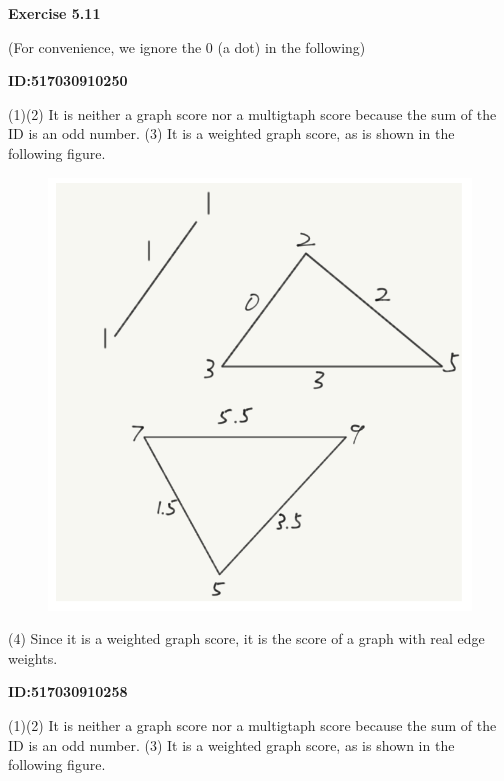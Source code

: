 \documentclass{article} %
\begin{document}
	\textbf{Exercise 5.11}\par
	(For convenience, we ignore the 0 (a dot) in the following)\par
	\textbf{ID:517030910250}\par
	(1)(2) It is neither a graph score nor a multigtaph score because the sum of the ID is an odd number.
	(3) It is a weighted graph score, as is shown in the following figure.
	
	\begin{figure}[H]
		\centering
		\includegraphics[scale=0.6]{10250.png}
		\caption{}
		\label{fig:1}
	\end{figure}
	(4) Since it is a weighted graph score, it is the score of a graph with real edge weights.

	\textbf{ID:517030910258}\par
	(1)(2) It is neither a graph score nor a multigtaph score because the sum of the ID is an odd number.
	(3) It is a weighted graph score, as is shown in the following figure.
	
\end{document}
